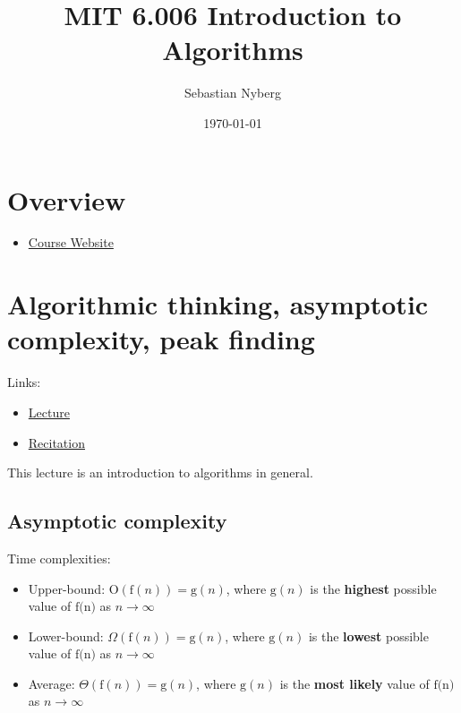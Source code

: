 \documentclass{article}
\title{MIT 6.006 Introduction to Algorithms}
\author{Sebastian Nyberg}
\date{\today}
\begin{document}
\setcounter{section}{-1}

\maketitle
\tableofcontents
\clearpage

\renewcommand{\arraystretch}{1.} %

\section{Overview}

\begin{itemize}
  \item \href{https://ocw.mit.edu/courses/electrical-engineering-and-computer-science/6-006-introduction-to-algorithms-fall-2011/index.htm}{Course Website}
\end{itemize}

\section{Algorithmic thinking, asymptotic complexity, peak finding}

Links:

\begin{itemize}
  \item \href{https://www.youtube.com/watch?v=HtSuA80QTyo}{Lecture}
  \item \href{https://www.youtube.com/watch?v=P7frcB_-g4w&}{Recitation}
\end{itemize}

\noindent
This lecture is an introduction to algorithms in general. 

\subsection{Asymptotic complexity}

Time complexities:

\begin{itemize}
  \item Upper-bound: $\textrm{O}(\textrm{f}(n)) = \textrm{g}(n)$, where $\textrm{g}(n)$ is the \textbf{highest} possible value of $\textrm{f(n)}$ as $n \rightarrow \infty$
  \item Lower-bound: $\Omega(\textrm{f}(n)) = \textrm{g}(n)$, where $\textrm{g}(n)$ is the \textbf{lowest} possible value of $\textrm{f(n)}$ as $n \rightarrow \infty$
  \item Average: $\Theta(\textrm{f}(n)) = \textrm{g}(n)$, where $\textrm{g}(n)$ is the \textbf{most likely} value of $\textrm{f(n)}$ as $n \rightarrow \infty$
\end{itemize}
\end{document}
